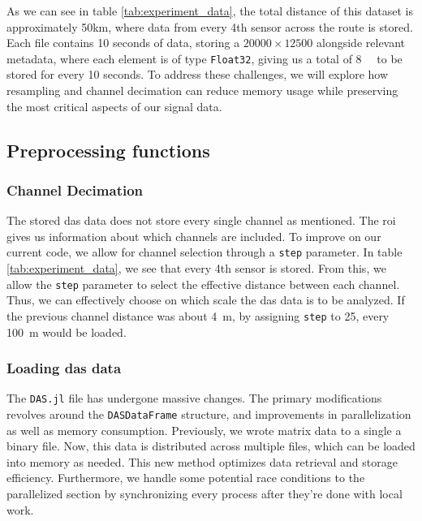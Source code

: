 As we can see in table \ref{tab:experiment_data}, the total distance of this dataset is approximately 50km, where data from every 4th sensor across the route is stored. Each file contains 10 seconds of data, storing a $20000 \times 12500$ alongside relevant metadata, where each element is of type \texttt{Float32}, giving us a total of \qty{8}{\giga\byte} to be stored for every 10 seconds. To address these challenges, we will explore how resampling and channel decimation can reduce memory usage while preserving the most critical aspects of our signal data. \\


\subsection{Preprocessing functions}

\subsubsection{Channel Decimation}

The stored \acrshort{das} data does not store every single channel as mentioned. The \acrfull{roi} gives us information about which channels are included. To improve on our current code, we allow for channel selection through a \texttt{step} parameter. In table \ref{tab:experiment_data}, we see that every 4th sensor is stored. From this, we allow the \texttt{step} parameter to select the effective distance between each channel. Thus, we can effectively choose on which scale the \acrshort{das} data is to be analyzed. If the previous channel distance was about \qty{4}{\meter}, by assigning \texttt{step} to 25, every \qty{100}{\meter} would be loaded. \\

\subsubsection{Loading \acrshort{das} data}

The \texttt{DAS.jl} file has undergone massive changes. The primary modifications revolves around the \texttt{DASDataFrame} structure, and improvements in parallelization as well as memory consumption. Previously, we wrote matrix data to a single a binary file. Now, this data is distributed across multiple files, which can be loaded into memory as needed. This new method optimizes data retrieval and storage efficiency. Furthermore, we handle some potential race conditions to the parallelized section by synchronizing every process after they're done with local work. 

